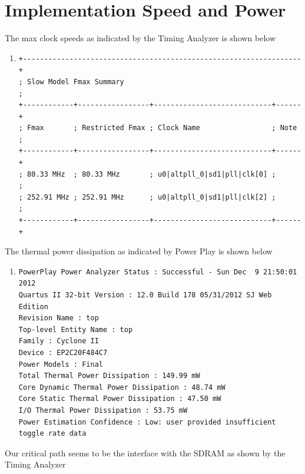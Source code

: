 \documentclass[10pt]{article}
\begin{document}
\section*{Implementation Speed and Power}
The max clock speeds as indicated by the Timing Analyzer is shown below
\begin{enumerate}
    \item[]
        \begin{verbatim}
+------------------------------------------------------------------+
; Slow Model Fmax Summary                                          ;                                                                                                                                                                                    
+------------+-----------------+----------------------------+------+
; Fmax       ; Restricted Fmax ; Clock Name                 ; Note ;
+------------+-----------------+----------------------------+------+
; 80.33 MHz  ; 80.33 MHz       ; u0|altpll_0|sd1|pll|clk[0] ;      ;
; 252.91 MHz ; 252.91 MHz      ; u0|altpll_0|sd1|pll|clk[2] ;      ;
+------------+-----------------+----------------------------+------+
\end{verbatim}
\end{enumerate}
The thermal power dissipation as indicated by Power Play is shown below
\begin{enumerate}
    \item[]
        \begin{verbatim}
PowerPlay Power Analyzer Status : Successful - Sun Dec  9 21:50:01 2012
Quartus II 32-bit Version : 12.0 Build 178 05/31/2012 SJ Web Edition
Revision Name : top
Top-level Entity Name : top
Family : Cyclone II
Device : EP2C20F484C7
Power Models : Final
Total Thermal Power Dissipation : 149.99 mW
Core Dynamic Thermal Power Dissipation : 48.74 mW
Core Static Thermal Power Dissipation : 47.50 mW
I/O Thermal Power Dissipation : 53.75 mW
Power Estimation Confidence : Low: user provided insufficient toggle rate data
        \end{verbatim}
\end{enumerate}
Our critical path seems to be the interface with the SDRAM as shown by the Timing Analyzer
\end{document}
